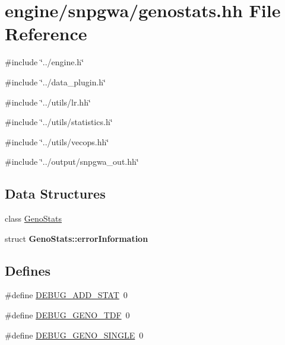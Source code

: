 \hypertarget{genostats_8hh}{
\section{engine/snpgwa/genostats.hh File Reference}
\label{genostats_8hh}
}
{\ttfamily \#include \char`\"{}../engine.h\char`\"{}}\par
{\ttfamily \#include \char`\"{}../data\_\-plugin.h\char`\"{}}\par
{\ttfamily \#include \char`\"{}../utils/lr.hh\char`\"{}}\par
{\ttfamily \#include \char`\"{}../utils/statistics.h\char`\"{}}\par
{\ttfamily \#include \char`\"{}../utils/vecops.hh\char`\"{}}\par
{\ttfamily \#include \char`\"{}../output/snpgwa\_\-out.hh\char`\"{}}\par
\subsection*{Data Structures}
\begin{DoxyCompactItemize}
\item 
class \hyperlink{classGenoStats}{GenoStats}
\item 
struct {\bfseries GenoStats::errorInformation}
\end{DoxyCompactItemize}
\subsection*{Defines}
\begin{DoxyCompactItemize}
\item 
\#define \hyperlink{genostats_8hh_a37acf130446eb5259a580d6698ab64ab}{DEBUG\_\-ADD\_\-STAT}~0
\item 
\#define \hyperlink{genostats_8hh_a752e1ca60a4f4f81676221efeb1cc895}{DEBUG\_\-GENO\_\-TDF}~0
\item 
\#define \hyperlink{genostats_8hh_aa2d894fba69489f0ab980c1e3b75d87e}{DEBUG\_\-GENO\_\-SINGLE}~0
\end{DoxyCompactItemize}


